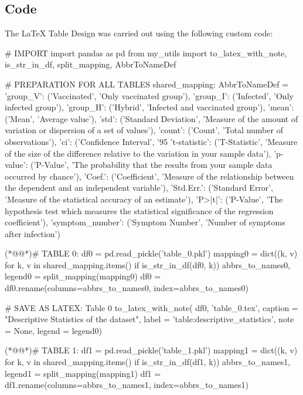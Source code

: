 \documentclass[11pt]{article}
\begin{document}
\subsection{{Code}}
The LaTeX Table Design was carried out using the following custom code:

\begin{python}

# IMPORT
import pandas as pd
from my_utils import to_latex_with_note, is_str_in_df, split_mapping, AbbrToNameDef

# PREPARATION FOR ALL TABLES
shared_mapping: AbbrToNameDef = {
    'group_V': ('Vaccinated', 'Only vaccinated group'),
    'group_I': ('Infected', 'Only infected group'),
    'group_H': ('Hybrid', 'Infected and vaccinated group'),
    'mean': ('Mean', 'Average value'),
    'std': ('Standard Deviation', 'Measure of the amount of variation or dispersion of a set of values'),
    'count': ('Count', 'Total number of observations'),
    'ci': ('Confidence Interval', '95%
    't-statistic': ('T-Statistic', 'Measure of the size of the difference relative to the variation in your sample data'),
    'p-value': ('P-Value', 'The probability that the results from your sample data occurred by chance'),
    'Coef.': ('Coefficient', 'Measure of the relationship between the dependent and an independent variable'),
    'Std.Err.': ('Standard Error', 'Measure of the statistical accuracy of an estimate'),
    'P>|t|': ('P-Value', 'The hypothesis test which measures the statistical significance of the regression coefficient'),
    'symptom_number': ('Symptom Number', 'Number of symptoms after infection')
}

(*@@*)# TABLE 0:
df0 = pd.read_pickle('table_0.pkl')
mapping0 = dict((k, v) for k, v in shared_mapping.items() if is_str_in_df(df0, k))
abbrs_to_names0, legend0 = split_mapping(mapping0)
df0 = df0.rename(columns=abbrs_to_names0, index=abbrs_to_names0)

# SAVE AS LATEX: Table 0
to_latex_with_note(
    df0, 'table_0.tex',
    caption = "Descriptive Statistics of the dataset",
    label = 'table:descriptive_statistics',
    note = None,
    legend = legend0)

(*@@*)# TABLE 1:
df1 = pd.read_pickle('table_1.pkl')
mapping1 = dict((k, v) for k, v in shared_mapping.items() if is_str_in_df(df1, k))
abbrs_to_names1, legend1 = split_mapping(mapping1)
df1 = df1.rename(columns=abbrs_to_names1, index=abbrs_to_names1)


\end{python}
\end{document}
